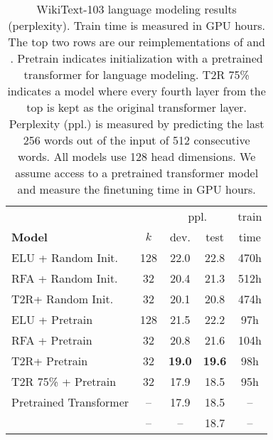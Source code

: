 \documentclass[11pt]{article}
\newcommand{\TRNN}{T2R\xspace}
\begin{document}
\begin{table}[h]
\centering
\addtolength{\tabcolsep}{-2.6pt}  
\begin{tabular}{@{} lcccc @{}}
\toprule
 & &  \multicolumn{2}{c}{ppl.} & train \\
\cmidrule(lr){3-4} \textbf{Model}& $k$ &dev.  & test & time \\
\hline
ELU + Random Init. & 128 & 22.0 & 22.8 & 470h \\
RFA + Random Init. & 32 & 20.4 & 21.3 & 512h\\
\TRNN + Random Init. & 32 & 20.1 & 20.8 & 474h\\
\hdashline
ELU + Pretrain & 128  & 21.5 & 22.2 &97h \\
RFA + Pretrain & 32 & 20.8 & 21.6 & 104h \\
\TRNN + Pretrain & 32 & \textbf{19.0} & \textbf{19.6} & 98h \\
\hdashline
\TRNN 75\% + Pretrain & 32 & 17.9 &18.5  &  95h\\
\hline
Pretrained Transformer  & -- & 17.9 & 18.5 &  --\\

\citet{Baevski2019AdaptiveIR}  & -- & -- & 18.7 & --\\
\bottomrule
\end{tabular}
\caption{
WikiText-103 language modeling results (perplexity). Train time is measured in GPU hours. The top two rows are our reimplementations of \citet{katharopoulos-et-al-2020} and \citet{RFA}. Pretrain indicates initialization with a pretrained transformer for language modeling. \TRNN 75\% indicates a model where every fourth layer from the top is kept as the original transformer layer. Perplexity (ppl.) is measured by predicting the last 256 words out of the input of 512 consecutive words. All models use 128 head dimensions. We assume access to a pretrained transformer model and measure the finetuning time in GPU hours. }
\label{lm_results}
\end{table}
\end{document}
